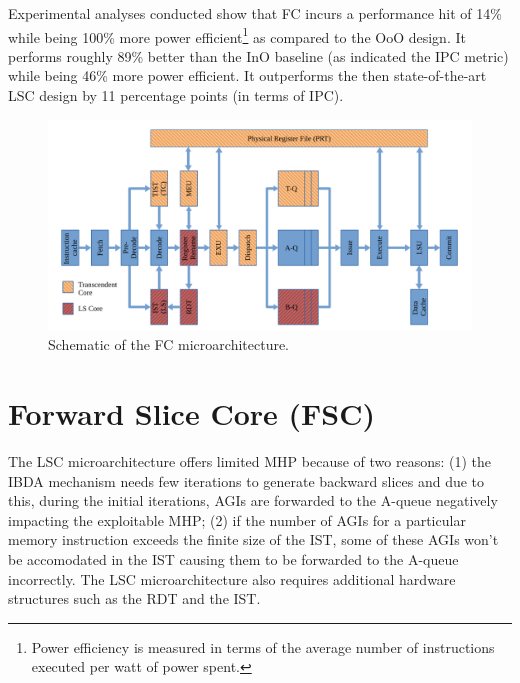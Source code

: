 \documentclass[a4paper,12pt, final]{report}
\begin{document}
Experimental analyses conducted show that FC incurs a performance hit of 14\% while being 100\% more power efficient\footnote[2]{Power efficiency is measured in terms of the average number of instructions executed per watt of power spent.} as compared to the OoO design. It performs roughly 89\% better than the InO baseline (as indicated the IPC metric) while being 46\% more power efficient. It outperforms the then state-of-the-art LSC design by 11 percentage points (in terms of IPC).

\begin{figure}[H]
    \begin{center}
    \includegraphics[width=\linewidth]{august22/img/freeflow.png}
    \caption{Schematic of the FC microarchitecture.}
    \end{center}
\end{figure}

\section{Forward Slice Core (FSC)}

The LSC microarchitecture offers limited MHP because of two reasons: (1) the IBDA mechanism needs few iterations to generate backward slices and due to this, during the initial iterations, AGIs are forwarded to the A-queue negatively impacting the exploitable MHP; (2) if the number of AGIs for a particular memory instruction exceeds the finite size of the IST, some of these AGIs won't be accomodated in the IST causing them to be forwarded to the A-queue incorrectly. The LSC microarchitecture also requires additional hardware structures such as the RDT and the IST.
\end{document}
